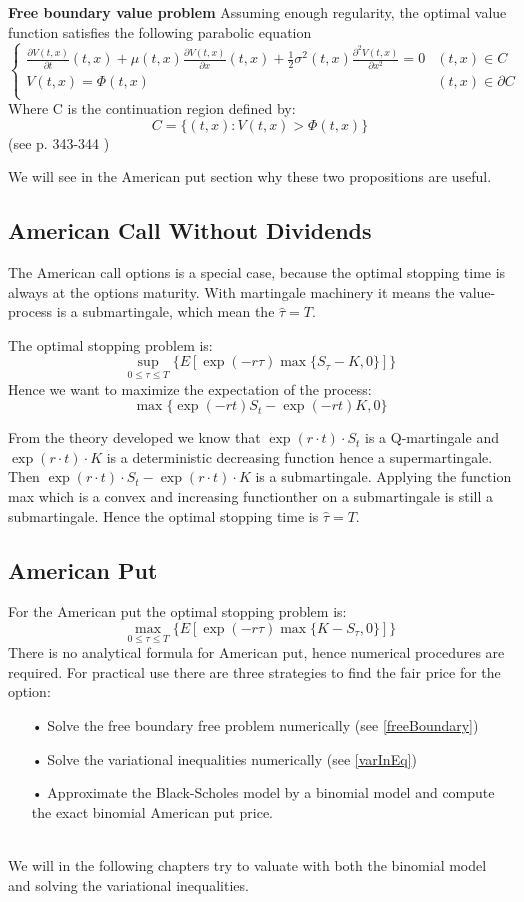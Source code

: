 \begin{proposition}{\textbf{Free boundary value problem}}\label{freeBoundary}
Assuming enough regularity, the optimal value function satisfies the following parabolic equation
\[ \begin{cases} 
      \frac{\partial V(t,x)}{\partial t}(t,x) + \mu(t,x) \frac{\partial V(t,x)}{\partial x}(t,x) + \frac{1}{2}\sigma^2(t,x)\frac{\partial^2 V(t,x)}{\partial x^2}=0 & (t,x)\in C \\
     V(t,x)=\Phi(t,x)  & (t,x)\in \partial C \\
   \end{cases}
\]
Where C is the continuation region defined by:
$$C=\{(t,x): V(t,x)>\Phi(t,x) \}$$
(see p. 343-344 \parencite{finKont})
\end{proposition}

We will see in the American put section why these two propositions are useful.

\subsection{American Call Without Dividends}
The American call options is a special case, because the optimal stopping time is always at the options maturity. With martingale machinery it means the value-process is a submartingale, which mean the $\hat{\tau}=T$.

The optimal stopping problem is:
$$\sup_{0 \leq \tau\leq T}\{E[\exp(-r \tau) \max\{S_{\tau} - K, 0\}]\}$$
Hence we want to maximize the expectation of the process:
$$ \max\{ \exp(-r t) S_{t} - \exp(-r t) K, 0 \}$$

From the theory developed we know that $\exp(r\cdot t) \cdot S_t$ is a Q-martingale and $\exp(r\cdot t) \cdot K$ is a deterministic decreasing function hence a supermartingale. Then $\exp(r\cdot t) \cdot S_t - \exp(r\cdot t) \cdot K$ is a submartingale. Applying the function max which is a convex and increasing functionther on a submartingale is still a submartingale. Hence the optimal stopping time is $\hat{\tau}=T$.

\subsection{American Put}
For the American put the optimal stopping problem is:
$$\max_{0 \leq \tau\leq T}\{E[\exp(-r \tau) \max\{K - S_{\tau}, 0\}]\}$$
There is no analytical formula for American put, hence numerical procedures are required. For practical use there are three strategies to find the fair price for the option:
\begin{enumerate}
\item[•] Solve the free boundary free problem numerically (see \ref{freeBoundary})
\item[•] Solve the variational inequalities numerically (see \ref{varInEq})
\item[•] Approximate the Black-Scholes model by a binomial model and compute the exact binomial American put price.
\end{enumerate}
\parencite{finKont}\\

We will in the following chapters try to valuate with both the binomial model and solving the variational inequalities.